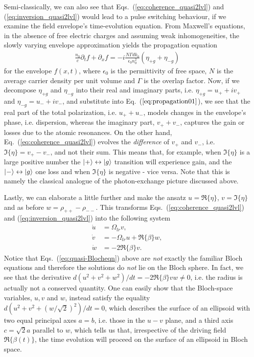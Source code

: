 \documentclass[reprint,secnumarabic,amssymb, nobibnotes, aip, prd]{revtex4-1}
\def\p{\partial}
\newcommand{\vspacec}{\vspace{-0.3cm}}
\begin{document}
\vspacec
Semi-classically, we can also see that Eqs.~(\ref{eq:coherence_quasi2lvl}) and (\ref{eq:inversion_quasi2lvl}) would lead to a pulse switching behaviour, if we examine the field envelope's time-evolution equation. From Maxwell's equations, in the absence of free electric charges and assuming weak inhomogeneities, the slowly varying envelope approximation yields the propagation equation \cite{jirauschek2014modeling}
\begin{align}
\label{eq:propagation01}
\frac{n_0}{c} \p_t f + \p_x f = -i\frac{N \Gamma d k_0}{\epsilon_0 n_0^2}(\eta_{+g}+\eta_{-g})
\end{align}
for the envelope $f(x,t)$, where $\epsilon_0$ is the permittivity of free space, $N$ is the average carrier density per unit volume and $\Gamma$ is the overlap factor. Now, if we decompose $\eta_{+g}$ and $\eta_{-g}$ into their real and imaginary parts, i.e. $\eta_{+g} = u_{+}+iv_{+}$ and $\eta_{-g} = u_{-}+iv_{-}$, and substitute into Eq.~($\ref{eq:propagation01}$), we see that the real part of the total polarization, i.e. $u_++u_-$, models changes in the envelope's phase, i.e. dispersion, whereas the imaginary part, $v_++v_-$, captures the gain or losses due to the atomic resonances. On the other hand, Eq.~(\ref{eq:coherence_quasi2lvl}) evolves the \emph{difference} of $v_+$ and $v_-$, i.e. $\Im\{\eta\}=v_+-v_-$, and not their sum. This means that, for example, when $\Im\{\eta\}$ is a large  positive number the $\ket{+}\leftrightarrow \ket{g}$ transition will experience gain, and the $\ket{-}\leftrightarrow\ket{g}$ one loss and when $\Im\{\eta\}$ is negative - vice versa. Note that this is namely the classical analogue of the photon-exchange picture discussed above.

Lastly, we can elaborate a little further and make the ansatz $u=\Re\{\eta\}$, $v =\Im\{\eta\}$ and as before $w = \rho_{++}-\rho_{--}$. This transforms Eqs.~(\ref{eq:coherence_quasi2lvl}) and (\ref{eq:inversion_quasi2lvl}) into the following system 
\begin{subequations}
	\label{eq:quasi-Blocheqn}
	\begin{align}
		\dot{u} &= \Omega_{lr} v , \\
		\dot{v} &= -\Omega_{lr} u +\Re\{\beta\} w , \\
		\dot{w} &= -2\Re\{\beta\} v.
	\end{align}
\end{subequations}
 Notice that Eqs.~(\ref{eq:quasi-Blocheqn}) above are \emph{not} exactly the familiar Bloch equations and therefore the solutions do \emph{not} lie on the Bloch sphere. In fact, we see that the derivative $d(u^2+v^2+w^2)/dt = -2\Re\{\beta\} vw \neq 0$, i.e. the radius is actually not a conserved quantity. One can easily show that the Bloch-space variables, $u,v $ and $w$, instead satisfy the equality $d(u^2+v^2+(w/\sqrt{2})^2)/dt = 0$, which describes the surface of an ellipsoid with two equal principal axes $a=b$, i.e. those in the $u-v$ plane, and a third axis $c = \sqrt{2}a$ parallel to $w$, which tells us that, irrespective of the driving field $\Re\{\beta(t)\}$, the time evolution will proceed on the surface of an ellipsoid in Bloch space. 
 
\end{document}
